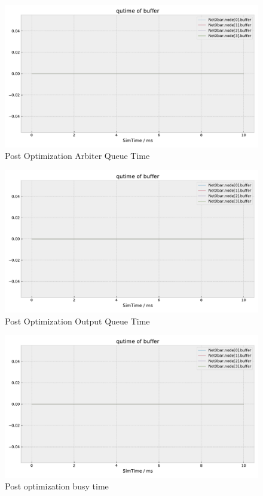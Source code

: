 \documentclass[]{scrartcl}
\begin{document}
\begin{figure}[H]
    \centering
    \includegraphics[width=\columnwidth, page=7]{../../python/results/postopt-General-0}
    \caption{Post Optimization Arbiter Queue Time}%
    \label{fig:postopt-arbiter-qtime}
\end{figure}
\begin{figure}[H]
    \centering
    \includegraphics[width=\columnwidth, page=6]{../../python/results/postopt-General-0}
    \caption{Post Optimization Output Queue Time}%
    \label{fig:postopt-outbuf-qtime}
\end{figure}
\begin{figure}[H]
    \centering
    \includegraphics[width=\columnwidth, page=9]{../../python/results/postopt-General-0}
    \caption{Post optimization busy time}%
    \label{fig:postopt-outbuf-busy}
\end{figure}
\end{document}

